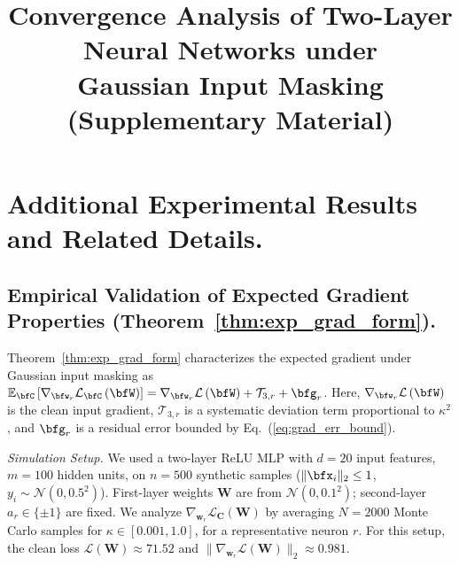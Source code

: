 \documentclass[10pt]{article} %
\theoremstyle{definition}
\theoremstyle{plain}
\newcommand{\paren}[1]{\left(#1\right)}
\providecommand{\E}{\mathbb{E}}
\def\calL{{\mathcal{L}}}
\begin{document}




\newpage
\title{Convergence Analysis of Two-Layer Neural Networks under\\ Gaussian Input Masking\\(Supplementary Material)}
\maketitle

\appendix

\section{Additional Experimental Results and Related Details.}
\subsection{Empirical Validation of Expected Gradient Properties (Theorem~\ref{thm:exp_grad_form}).}
Theorem~\ref{thm:exp_grad_form} characterizes the expected gradient under Gaussian input masking as $\E_{\bfC}\left[\nabla_{\bfw_r}\calL_{\bfC}\paren{\bfW}\right] = \nabla_{\bfw_r}\calL\paren{\bfW}+ \mathcal{T}_{3,r} + \bfg_{r}$. Here, $\nabla_{\bfw_r}\calL\paren{\bfW}$ is the clean input gradient, $\mathcal{T}_{3,r}$ is a systematic deviation term proportional to $\kappa^2$, and $\bfg_{r}$ is a residual error bounded by Eq.~(\ref{eq:grad_err_bound}).

\textit{Simulation Setup.} We used a two-layer ReLU MLP with $d=20$ input features, $m=100$ hidden units, on $n=500$ synthetic samples ($\|\bfx_i\|_2 \le 1$, $y_i \sim \mathcal{N}(0, 0.5^2)$). 
First-layer weights $\mathbf{W}$ are from $\mathcal{N}(0, 0.1^2)$; second-layer $a_r \in \{\pm 1\}$ are fixed. 
We analyze $\nabla_{\mathbf{w}_r}\mathcal{L}_{\mathbf{C}}(\mathbf{W})$ by averaging $N=2000$ Monte Carlo samples for $\kappa \in [0.001, 1.0]$, for a representative neuron $r$.
For this setup, the clean loss $\mathcal{L}(\mathbf{W}) \approx 71.52$ and $\|\nabla_{\mathbf{w}_r}\mathcal{L}(\mathbf{W})\|_2 \approx 0.981$.
\end{document}
